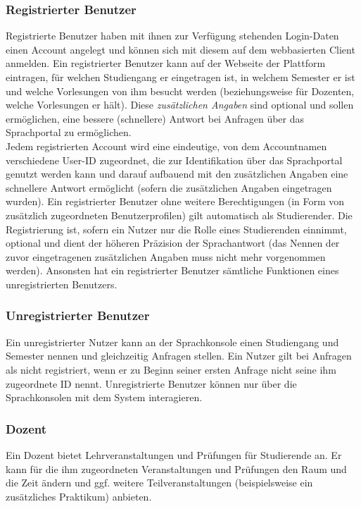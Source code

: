 \documentclass[12pt, a4paper]{scrartcl}
\begin{document}
\subsubsection{Registrierter Benutzer}
Registrierte Benutzer haben mit ihnen zur Verfügung stehenden Login-Daten  einen Account angelegt und können sich mit diesem auf dem webbasierten Client anmelden. Ein registrierter Benutzer kann auf der Webseite der Plattform eintragen, für welchen Studiengang er eingetragen ist, in welchem Semester er ist und welche Vorlesungen von ihm besucht werden (beziehungsweise für Dozenten, welche Vorlesungen er hält). Diese \emph{zusätzlichen Angaben} sind optional und sollen ermöglichen, eine bessere (schnellere) Antwort bei Anfragen über das Sprachportal zu ermöglichen.\\
Jedem registrierten Account wird eine eindeutige, von dem Accountnamen verschiedene User-ID zugeordnet, die zur Identifikation über das Sprachportal genutzt werden kann und darauf aufbauend mit den zusätzlichen Angaben eine schnellere Antwort ermöglicht (sofern die zusätzlichen Angaben eingetragen wurden). Ein registrierter Benutzer ohne weitere Berechtigungen (in Form von zusätzlich zugeordneten Benutzerprofilen) gilt automatisch als Studierender. Die Registrierung ist, sofern ein Nutzer nur die Rolle eines Studierenden einnimmt, optional und dient der höheren Präzision der Sprachantwort (das Nennen der zuvor eingetragenen zusätzlichen Angaben muss nicht mehr vorgenommen werden). Ansonsten hat ein registrierter Benutzer sämtliche Funktionen eines unregistrierten Benutzers.

\subsubsection{Unregistrierter Benutzer}
Ein unregistrierter Nutzer kann an der Sprachkonsole einen Studiengang und Semester nennen und gleichzeitig Anfragen stellen. Ein Nutzer gilt bei Anfragen als nicht registriert, wenn er zu Beginn seiner ersten Anfrage nicht seine ihm zugeordnete ID nennt. Unregistrierte Benutzer können nur über die Sprachkonsolen mit dem System interagieren.

\subsubsection{Dozent}
Ein Dozent bietet Lehrveranstaltungen und Prüfungen für Studierende an. Er kann für die ihm zugeordneten Veranstaltungen und Prüfungen den Raum und die Zeit ändern und ggf. weitere Teilveranstaltungen (beispielsweise ein zusätzliches Praktikum) anbieten.
\end{document}
